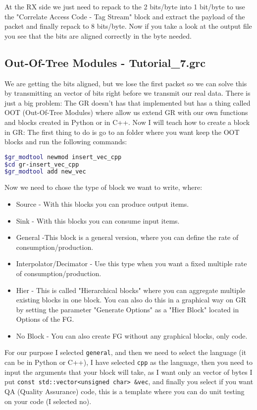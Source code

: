 \documentclass[a4paper, 10pt, conference]{ieeeconf}      %
\begin{document}
    At the RX side we just need to repack to the 2 bits/byte into 1 bit/byte to use the "Correlate Access Code - Tag Stream" block and extract the payload of the packet and finally repack to 8 bits/byte. Now if you take a look at the output file you see that the bits are aligned correctly in the byte needed.
    
\subsection{Out-Of-Tree Modules - Tutorial\_7.grc}
    We are getting the bits aligned, but we lose the first packet so we can solve this by transmitting an vector of bits right before we transmit our real data. There is just a big problem: The GR doesn't has that implemented but has a thing called OOT (Out-Of-Tree Modules) where allow us extend GR with our own functions and blocks created in Python or in C++. Now I will teach how to create a block in GR: The first thing to do is go to an folder where you want keep the OOT blocks and run the following commands: 

\begin{lstlisting}[language=bash, breaklines]
$gr_modtool newmod insert_vec_cpp
$cd gr-insert_vec_cpp
$gr_modtool add new_vec
\end{lstlisting}

    Now we need to chose the type of block we want to write, where:
    \begin{itemize}
        \item Source - With this blocks you can produce output items.
        \item Sink - With this blocks you can consume input items.
        \item General -This block is a general version, where you can define the rate of consumption/production. 
        \item Interpolator/Decimator - Use this type when you want a fixed multiple rate of consumption/production.
        \item Hier - This is called "Hierarchical blocks" where you can aggregate multiple existing blocks in one block. You can also do this in a graphical way on GR by setting the parameter "Generate Options" as a "Hier Block" located in Options of the FG.
        \item No Block - You can also create FG without any graphical blocks, only code.
    \end{itemize}
    
    For our purpose I selected \verb|general|, and then we need to select the language (it can be in Python or C++), I have selected \verb|cpp| as the language, then you need to input the arguments that your block will take, as I want only an vector of bytes I put \verb|const std::vector<unsigned char> &vec|, and  finally you select if you want QA (Quality Assurance) code, this is a template where you can do unit testing on your code (I selected no).
    
\end{document}
